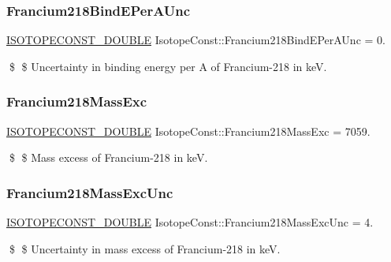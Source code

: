 \subsubsection{\texorpdfstring{Francium218\+Bind\+E\+Per\+A\+Unc}{Francium218BindEPerAUnc}}
{\footnotesize\ttfamily \mbox{\hyperlink{group___isotope_const-_macros_ga8f45a7272ce02c0b4c65c44636ed719a}{I\+S\+O\+T\+O\+P\+E\+C\+O\+N\+S\+T\+\_\+\+D\+O\+U\+B\+LE}} Isotope\+Const\+::\+Francium218\+Bind\+E\+Per\+A\+Unc = 0.}

\$ \$ Uncertainty in binding energy per A of Francium-\/218 in keV. \mbox{\label{group___isotope_const-_francium-_fr218_gad1ed42789953c7376c4ac5dfa8a4dcb3}} 
\subsubsection{\texorpdfstring{Francium218\+Mass\+Exc}{Francium218MassExc}}
{\footnotesize\ttfamily \mbox{\hyperlink{group___isotope_const-_macros_ga8f45a7272ce02c0b4c65c44636ed719a}{I\+S\+O\+T\+O\+P\+E\+C\+O\+N\+S\+T\+\_\+\+D\+O\+U\+B\+LE}} Isotope\+Const\+::\+Francium218\+Mass\+Exc = 7059.}

\$ \$ Mass excess of Francium-\/218 in keV. \mbox{\label{group___isotope_const-_francium-_fr218_ga997af7645604fc9544c92198fce5e14c}} 
\subsubsection{\texorpdfstring{Francium218\+Mass\+Exc\+Unc}{Francium218MassExcUnc}}
{\footnotesize\ttfamily \mbox{\hyperlink{group___isotope_const-_macros_ga8f45a7272ce02c0b4c65c44636ed719a}{I\+S\+O\+T\+O\+P\+E\+C\+O\+N\+S\+T\+\_\+\+D\+O\+U\+B\+LE}} Isotope\+Const\+::\+Francium218\+Mass\+Exc\+Unc = 4.}

\$ \$ Uncertainty in mass excess of Francium-\/218 in keV. \mbox{\label{group___isotope_const-_francium-_fr218_gaa8350820ac25bf0923c92bce5bd2105d}} 
